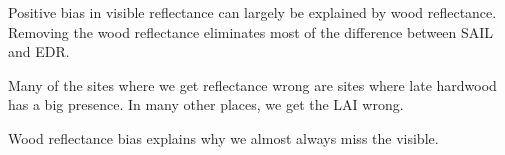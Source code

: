 Positive bias in visible reflectance can largely be explained by wood reflectance.
Removing the wood reflectance eliminates most of the difference between SAIL and EDR.

Many of the sites where we get reflectance wrong are sites where late hardwood has a big presence.
In many other places, we get the LAI wrong.

Wood reflectance bias explains why we almost always miss the visible.




